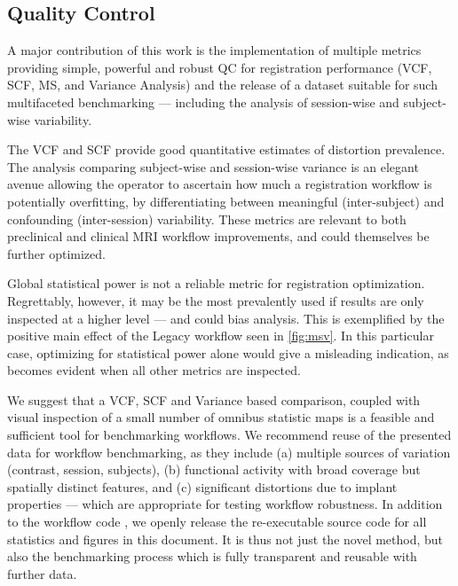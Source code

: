 \subsection{Quality Control}

A major contribution of this work is the implementation of multiple metrics providing simple, powerful and robust QC for registration performance (VCF, SCF, MS, and Variance Analysis) and the release of a dataset \cite{irsabi_bidsdata} suitable for such multifaceted benchmarking --- including the analysis of session-wise and subject-wise variability.

The VCF and SCF provide good quantitative estimates of distortion prevalence.
The analysis comparing subject-wise and session-wise variance is an elegant avenue allowing the operator to ascertain how much a registration workflow is potentially overfitting, by differentiating between meaningful (inter-subject) and confounding (inter-session) variability.
These metrics are relevant to both preclinical and clinical MRI workflow improvements, and could themselves be further optimized.

Global statistical power is not a reliable metric for registration optimization.
Regrettably, however, it may be the most prevalently used if results are only inspected at a higher level --- and could bias analysis.
This is exemplified by the positive main effect of the Legacy workflow seen in \cref{fig:msv}.
In this particular case, optimizing for statistical power alone would give a misleading indication, as becomes evident when all other metrics are inspected.

We suggest that a VCF, SCF and Variance based comparison, coupled with visual inspection of a small number of omnibus statistic maps is a feasible and sufficient tool for benchmarking workflows.
We recommend reuse of the presented data for workflow benchmarking, as they include (a) multiple sources of variation (contrast, session, subjects), (b) functional activity with broad coverage but spatially distinct features, and (c) significant distortions due to implant properties --- which are appropriate for testing workflow robustness.
In addition to the workflow code \cite{samri}, we openly release the re-executable source code \cite{source} for all statistics and figures in this document.
It is thus not just the novel method, but also the benchmarking process which is fully transparent and reusable with further data.

